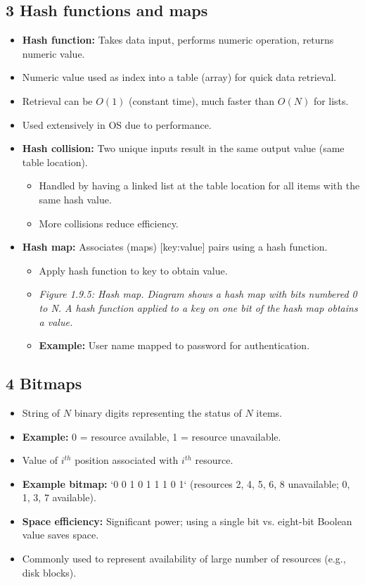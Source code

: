 \documentclass{article}
\begin{document}
\subsection*{3 Hash functions and maps}
\begin{itemize}
    \item \textbf{Hash function:} Takes data input, performs numeric operation, returns numeric value.
    \item Numeric value used as index into a table (array) for quick data retrieval.
    \item Retrieval can be $O(1)$ (constant time), much faster than $O(N)$ for lists.
    \item Used extensively in OS due to performance.
    \item \textbf{Hash collision:} Two unique inputs result in the same output value (same table location).
    \begin{itemize}
        \item Handled by having a linked list at the table location for all items with the same hash value.
        \item More collisions reduce efficiency.
    \end{itemize}
    \item \textbf{Hash map:} Associates (maps) [key:value] pairs using a hash function.
    \begin{itemize}
        \item Apply hash function to key to obtain value.
        \item \textit{Figure 1.9.5: Hash map. Diagram shows a hash map with bits numbered 0 to N. A hash function applied to a key on one bit of the hash map obtains a value.}
        \item \textbf{Example:} User name mapped to password for authentication.
    \end{itemize}
\end{itemize}

\subsection*{4 Bitmaps}
\begin{itemize}
    \item String of $N$ binary digits representing the status of $N$ items.
    \item \textbf{Example:} 0 = resource available, 1 = resource unavailable.
    \item Value of $i^{th}$ position associated with $i^{th}$ resource.
    \item \textbf{Example bitmap:} `0 0 1 0 1 1 1 0 1` (resources 2, 4, 5, 6, 8 unavailable; 0, 1, 3, 7 available).
    \item \textbf{Space efficiency:} Significant power; using a single bit vs. eight-bit Boolean value saves space.
    \item Commonly used to represent availability of large number of resources (e.g., disk blocks).
\end{itemize}
\end{document}
